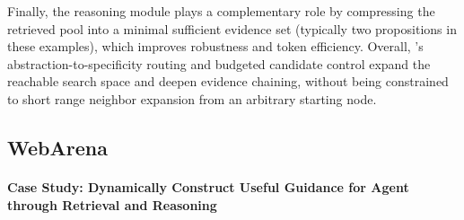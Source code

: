 Finally, the reasoning module plays a complementary role by compressing the retrieved pool into a minimal sufficient evidence set (typically two propositions in these examples), which improves robustness and token efficiency. Overall, \plugmem's abstraction-to-specificity routing and budgeted candidate control expand the reachable search space and deepen evidence chaining, without being constrained to short range neighbor expansion from an arbitrary starting node. 


\subsection{WebArena}

\paragraph{Case Study: \plugmem Dynamically Construct Useful Guidance for Agent through Retrieval and Reasoning}

